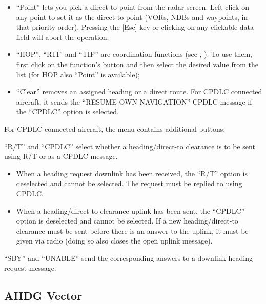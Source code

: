 \documentclass[a4paper,oneside,11pt]{memoir}
\begin{document}
\begin{itemize}
  \item “Point” lets you pick a direct-to point from the radar screen. Left-click on any point to set it as the direct-to point (VORs, NDBs and waypoints, in that priority order). Pressing the [Esc] key or clicking on any clickable data field will abort the operation;
  \item “HOP”, “RTI” and “TIP” are coordination functions (see , ). To use them, first click on the function’s button and then select the desired value from the list (for HOP also “Point” is available);
  \item “Clear” removes an assigned heading or a direct route. For CPDLC connected aircraft, it sends the “RESUME OWN NAVIGATION” CPDLC message if the “CPDLC” option is selected.
\end{itemize}


\bigskip

For CPDLC connected aircraft, the menu contains additional buttons:

\bigskip

“R/T” and “CPDLC” select whether a heading/direct-to clearance is to be sent using R/T or as a CPDLC message.

\bigskip

\begin{itemize}
        \item When a heading request downlink has been received, the “R/T” option is deselected
    and cannot be selected. The request must be replied to using CPDLC.
        \item When a heading/direct-to clearance uplink has been sent, the “CPDLC” option is deselected and cannot be selected. If a new heading/direct-to clearance must be sent before there is an answer to the uplink, it must be given via radio (doing so also closes the open uplink message).
\end{itemize}

\bigskip

“SBY” and “UNABLE” send the corresponding answers to a downlink heading request
message.


\subsection{AHDG Vector}\label{menu:ahdgv}
\end{document}
